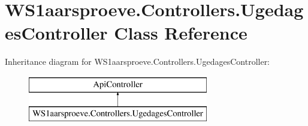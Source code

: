 \hypertarget{class_w_s1aarsproeve_1_1_controllers_1_1_ugedages_controller}{}\section{W\+S1aarsproeve.\+Controllers.\+Ugedages\+Controller Class Reference}
\label{class_w_s1aarsproeve_1_1_controllers_1_1_ugedages_controller}
Inheritance diagram for W\+S1aarsproeve.\+Controllers.\+Ugedages\+Controller\+:\begin{figure}[H]
\begin{center}
\leavevmode
\includegraphics[height=2.000000cm]{class_w_s1aarsproeve_1_1_controllers_1_1_ugedages_controller}
\end{center}
\end{figure}
